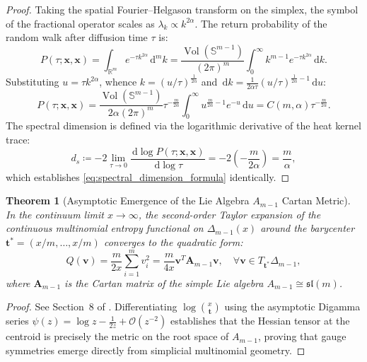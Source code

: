 \documentclass[11pt,a4paper,reqno]{amsart}
\newtheorem{theorem}{Theorem}[section]
\theoremstyle{definition}
\numberwithin{equation}{section}
\newcommand{\R}{\mathbb{R}}
\newcommand{\Sph}{\mathbb{S}}
\newcommand{\dif}{\,\mathrm{d}}
\begin{document}
\begin{proof}
Taking the spatial Fourier--Helgason transform on the simplex, the symbol of the fractional operator scales as $\lambda_k \propto k^{2\alpha}$. The return probability of the random walk after diffusion time $\tau$ is:
\begin{equation}
    P(\tau; \mathbf{x}, \mathbf{x}) = \int_{\R^m} e^{-\tau k^{2\alpha}} \dif^m k = \frac{\operatorname{Vol}(\Sph^{m-1})}{(2\pi)^m} \int_0^\infty k^{m-1} e^{-\tau k^{2\alpha}} \dif k.
\end{equation}
Substituting $u = \tau k^{2\alpha}$, whence $k = (u/\tau)^{\frac{1}{2\alpha}}$ and $\dif k = \frac{1}{2\alpha \tau} (u/\tau)^{\frac{1}{2\alpha} - 1} \dif u$:
\begin{equation}
    P(\tau; \mathbf{x}, \mathbf{x}) = \frac{\operatorname{Vol}(\Sph^{m-1})}{2\alpha (2\pi)^m} \tau^{-\frac{m}{2\alpha}} \int_0^\infty u^{\frac{m}{2\alpha} - 1} e^{-u} \dif u = C(m, \alpha) \tau^{-\frac{m}{2\alpha}}.
\end{equation}
The spectral dimension is defined via the logarithmic derivative of the heat kernel trace:
\begin{equation}
    d_s \coloneqq -2 \lim_{\tau \to 0} \frac{\dif \log P(\tau; \mathbf{x}, \mathbf{x})}{\dif \log \tau} = -2 \left( -\frac{m}{2\alpha} \right) = \frac{m}{\alpha},
\end{equation}
which establishes \eqref{eq:spectral_dimension_formula} identically.
\end{proof}

\begin{theorem}[Asymptotic Emergence of the Lie Algebra $A_{m-1}$ Cartan Metric]
\label{thm:cartan_metric_emergence}
In the continuum limit $x \to \infty$, the second-order Taylor expansion of the continuous multinomial entropy functional on $\Delta_{m-1}(x)$ around the barycenter $\mathbf{t}^* = (x/m, \dots, x/m)$ converges to the quadratic form:
\begin{equation}
    \label{eq:cartan_quadratic}
    Q(\mathbf{v}) = \frac{m}{2 x} \sum_{i=1}^m v_i^2 = \frac{m}{4 x} \mathbf{v}^T \mathbf{A}_{m-1} \mathbf{v}, \quad \forall \mathbf{v} \in T_{\mathbf{t}^*} \Delta_{m-1},
\end{equation}
where $\mathbf{A}_{m-1}$ is the Cartan matrix of the simple Lie algebra $A_{m-1} \cong \mathfrak{sl}(m)$.
\end{theorem}
\begin{proof}
See Section~8 of \cite{monarch2026pascal}. Differentiating $\log \binom{x}{\mathbf{t}}$ using the asymptotic Digamma series $\psi(z) = \log z - \frac{1}{2z} + \mathcal{O}(z^{-2})$ establishes that the Hessian tensor at the centroid is precisely the metric on the root space of $A_{m-1}$, proving that gauge symmetries emerge directly from simplicial multinomial geometry.
\end{proof}
\end{document}

